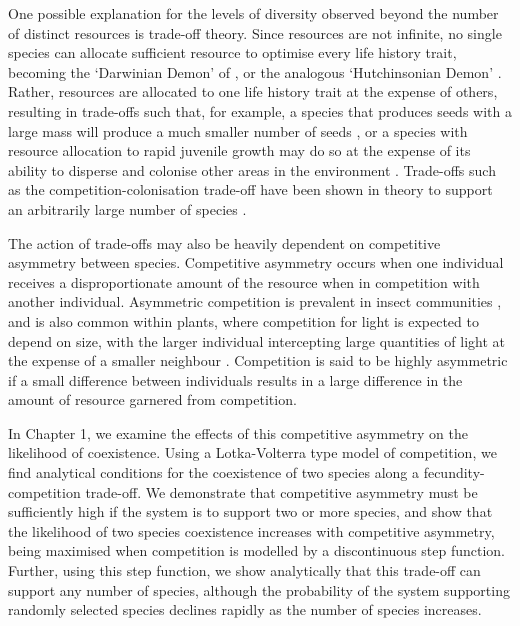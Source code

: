  One possible explanation for the levels of diversity observed beyond the number of distinct resources is trade-off theory. Since resources are not infinite, no single species can allocate sufficient resource to optimise every life history trait, becoming the `Darwinian Demon' of \cite{law1979optimal}, or the analogous `Hutchinsonian Demon' \citep[e.g.][]{kneitel2004trade}. Rather, resources are allocated to one life history trait  at the expense of others, resulting in trade-offs such that, for example, a species that produces seeds with a large mass will produce a much smaller number of seeds \citep[e.g.][]{greene1993seed,venable1992size}, or a species with resource allocation to rapid juvenile growth may do so at the expense of its ability to disperse and colonise other areas in the environment \citep[e.g.][]{tilman1994competition, cadotte2006testing}. Trade-offs such as the competition-colonisation trade-off have been shown in theory to support an arbitrarily large number of species \citep{tilman1994competition}.
 
 The action of trade-offs may also be heavily dependent on competitive asymmetry between species. Competitive asymmetry occurs when one individual receives a disproportionate amount of the resource when in competition with another individual. Asymmetric competition is prevalent in insect communities \citep{lawton1981asymmetrical}, and is also common within plants, where competition for light is expected to depend on size, with the larger individual intercepting large quantities of light at the expense of a smaller neighbour \citep{weiner1990asymmetric}. Competition is said to be highly asymmetric if a small difference between individuals results in a large difference in the amount of resource garnered from competition.
 
 In Chapter 1, we examine the effects of this competitive asymmetry on the likelihood of coexistence. Using a Lotka-Volterra type model of competition, we find analytical conditions for the coexistence of two species along a fecundity-competition trade-off. We demonstrate that competitive asymmetry must be sufficiently high if the system is to support two or more species, and show that the likelihood of two species coexistence increases with competitive asymmetry, being maximised when competition is modelled by a discontinuous step function. Further, using this step function, we show analytically that this trade-off can support any number of species, although the probability of the system supporting randomly selected species declines rapidly as the number of species increases.
 
